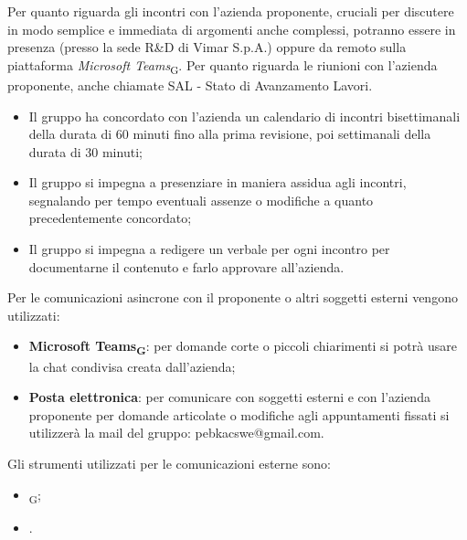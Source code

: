 Per quanto riguarda gli incontri con l'azienda proponente, cruciali per discutere in modo semplice e immediata di argomenti anche complessi, potranno essere in presenza (presso la sede R\&D di Vimar S.p.A.) oppure da remoto sulla piattaforma \textit{Microsoft Teams}\textsubscript{G}. Per quanto riguarda le riunioni con l'azienda proponente, anche chiamate SAL - Stato di Avanzamento Lavori.
\begin{itemize}
    \item Il gruppo ha concordato con l'azienda un calendario di incontri bisettimanali della durata di 60 minuti fino alla prima revisione, poi settimanali della durata di 30 minuti;
    \item Il gruppo si impegna a presenziare in maniera assidua agli incontri, segnalando per tempo eventuali assenze o modifiche a quanto precedentemente concordato;
    \item Il gruppo si impegna a redigere un verbale per ogni incontro per documentarne il contenuto e farlo approvare all'azienda. 
\end{itemize}
Per le comunicazioni asincrone con il proponente o altri soggetti esterni vengono utilizzati:
\begin{itemize}
    \item \textbf{Microsoft Teams\textsubscript{G}}: per domande corte o piccoli chiarimenti si potrà usare la chat condivisa creata dall'azienda;
    \item \textbf{Posta elettronica}: per comunicare con soggetti esterni e con l'azienda proponente per domande articolate o modifiche agli appuntamenti fissati si utilizzerà la mail del gruppo: pebkacswe@gmail.com.
\end{itemize}
Gli strumenti utilizzati per le comunicazioni esterne sono:
\begin{itemize}
    \item \textit{}\textsubscript{G};
    \item {}.
\end{itemize}

